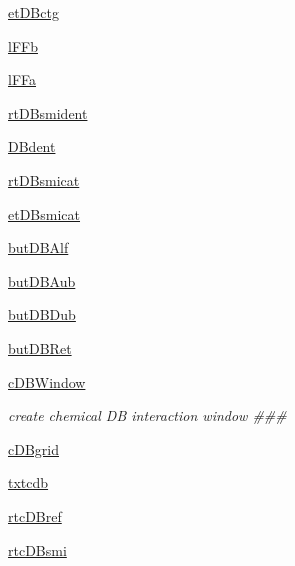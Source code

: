 \begin{DoxyCompactItemize}
\hyperlink{classmolSimplify_1_1Classes_1_1mGUI_1_1mGUI_aafb29aee272624df2c07ed41a297d53d}{et\+D\+Bctg}
\item 
\hyperlink{classmolSimplify_1_1Classes_1_1mGUI_1_1mGUI_a48cda368ec39a8141456c359d0e3ce2e}{l\+F\+Fb}
\item 
\hyperlink{classmolSimplify_1_1Classes_1_1mGUI_1_1mGUI_a85e9e22cfa552c0a3b9c6609e66c9272}{l\+F\+Fa}
\item 
\hyperlink{classmolSimplify_1_1Classes_1_1mGUI_1_1mGUI_abde0b3859d1b49aa4622f6585ed151b9}{rt\+D\+Bsmident}
\item 
\hyperlink{classmolSimplify_1_1Classes_1_1mGUI_1_1mGUI_a9e26c543d7cd22035d828e4b1b88821d}{D\+Bdent}
\item 
\hyperlink{classmolSimplify_1_1Classes_1_1mGUI_1_1mGUI_a88c6a7b18a863c16292bbcd76b11ec36}{rt\+D\+Bsmicat}
\item 
\hyperlink{classmolSimplify_1_1Classes_1_1mGUI_1_1mGUI_a9d593199be32ea2e25726c56977ca964}{et\+D\+Bsmicat}
\item 
\hyperlink{classmolSimplify_1_1Classes_1_1mGUI_1_1mGUI_ad063268a2d32115581b8822bc6749d85}{but\+D\+B\+Alf}
\item 
\hyperlink{classmolSimplify_1_1Classes_1_1mGUI_1_1mGUI_afb1a107d3c0a7091fe541d2e933326ec}{but\+D\+B\+Aub}
\item 
\hyperlink{classmolSimplify_1_1Classes_1_1mGUI_1_1mGUI_af9b58c06a43544313a1ea9015bf47fc7}{but\+D\+B\+Dub}
\item 
\hyperlink{classmolSimplify_1_1Classes_1_1mGUI_1_1mGUI_aeab7c0547a9308efbe147be26b25b99e}{but\+D\+B\+Ret}
\item 
\hyperlink{classmolSimplify_1_1Classes_1_1mGUI_1_1mGUI_a5d649628636ee1242c52e0908a90a76e}{c\+D\+B\+Window}
\begin{DoxyCompactList}\small\item\em create chemical DB interaction window \#\#\# \end{DoxyCompactList}\item 
\hyperlink{classmolSimplify_1_1Classes_1_1mGUI_1_1mGUI_a2b13796e68a8b5fbe39062da3ad86f34}{c\+D\+Bgrid}
\item 
\hyperlink{classmolSimplify_1_1Classes_1_1mGUI_1_1mGUI_a921b0efa8adec33b5a49e1912f19980b}{txtcdb}
\item 
\hyperlink{classmolSimplify_1_1Classes_1_1mGUI_1_1mGUI_ad3666099beb9c07bf1f0af6b2191d9d3}{rtc\+D\+Bref}
\item 
\hyperlink{classmolSimplify_1_1Classes_1_1mGUI_1_1mGUI_a17b03b63c8310daaaf1ced98c31caa12}{rtc\+D\+Bsmi}
\item 

\end{DoxyCompactItemize}
